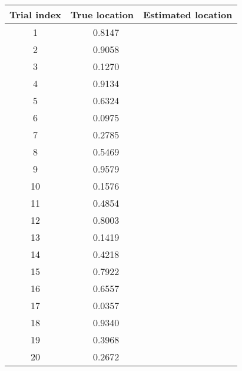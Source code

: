 \begin{enumerate}
\begin{enumerate}
\begin{table}[h]
\centering
    \begin{tabular}{|c|c|c|}
    \hline Trial index & True location & Estimated location  \\ \hline
    1           & ~       0.8147        	  &    \\ \hline
    2           & ~       0.9058             &    \\ \hline
    3           & ~       0.1270             &    \\ \hline
    4           & ~       0.9134             &    \\ \hline
    5           & ~       0.6324             &    \\ \hline
    6           & ~       0.0975             &    \\ \hline
    7           & ~       0.2785             &    \\ \hline
    8           & ~       0.5469             &    \\ \hline
    9           & ~       0.9579             &    \\ \hline
    10          & ~       0.1576             &    \\ \hline
    11          & ~       0.4854             &    \\ \hline
    12          & ~       0.8003             &    \\ \hline
    13          & ~       0.1419             &    \\ \hline
    14          & ~       0.4218             &    \\ \hline
    15          & ~       0.7922             &    \\ \hline
    16          & ~       0.6557             &    \\ \hline
    17          & ~       0.0357             &    \\ \hline
    18          & ~       0.9340             &    \\ \hline
    19          & ~       0.3968             &    \\ \hline
    20          & ~       0.2672             &    \\ \hline
    \end{tabular}
\end{table}

\end{enumerate} 

\end{enumerate}

\newpage

